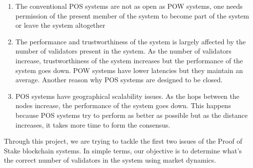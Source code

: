 \begin{enumerate}
    \item The conventional POS systems are not as open as POW systems, one needs permission of the present member of the system to become part of the system or leave the system altogether
    \item The performance and trustworthiness of the system is largely affected by the number of validators present in the system. As the number of validators increase, trustworthiness of the system increases but the performance of the system goes down. POW systems have lower latencies but they maintain an average. Another reason why POS systems are designed to be closed.
    \item POS systems have geographical scalability issues. As the hops between the nodes increase, the performance of the system goes down. This happens because POS systems try to perform as better as possible but as the distance increases, it takes more time to form the consensus.
\end{enumerate}
Through this project, we are trying to tackle the first two issues of the Proof of Stake blockchain systems. In simple terms, our objective is to determine what's the correct number of validators in the system using market dynamics.




